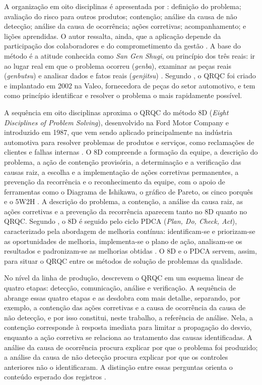 A organização em oito disciplinas é apresentada por : definição do problema; avaliação do risco para outros produtos; contenção; análise da causa de não detecção; análise da causa de ocorrência; ações corretivas; acompanhamento; e lições aprendidas. O autor ressalta, ainda, que a aplicação depende da participação dos colaboradores e do comprometimento da gestão \cite[p.~221]{moreira2023}. A base do método é a atitude conhecida como \textit{San Gen Shugi}, ou princípio dos três reais: ir ao lugar real em que o problema ocorreu (\textit{genba}), examinar as peças reais (\textit{genbutsu}) e analisar dados e fatos reais (\textit{genjitsu}) \cite[p.~224]{moreira2023}. Segundo , o QRQC foi criado e implantado em 2002 na Valeo, fornecedora de peças do setor automotivo, e tem como princípio identificar e resolver o problema o mais rapidamente possível.

A sequência em oito disciplinas aproxima o QRQC do método 8D (\textit{Eight Disciplines of Problem Solving}), desenvolvido na Ford Motor Company e introduzido em 1987, que vem sendo aplicado principalmente na indústria automotiva para resolver problemas de produtos e serviços, como reclamações de clientes e falhas internas \cite[seç.~2]{realyvasquez2020}. O 8D compreende a formação da equipe, a descrição do problema, a ação de contenção provisória, a determinação e a verificação das causas raiz, a escolha e a implementação de ações corretivas permanentes, a prevenção da recorrência e o reconhecimento da equipe, com o apoio de ferramentas como o Diagrama de Ishikawa, o gráfico de Pareto, os cinco porquês e o 5W2H \cite[seç.~1 e 3]{realyvasquez2020}. A descrição do problema, a contenção, a análise da causa raiz, as ações corretivas e a prevenção da recorrência aparecem tanto no 8D quanto no QRQC. Segundo , o 8D é seguido pelo ciclo PDCA (\textit{Plan, Do, Check, Act}), caracterizado pela abordagem de melhoria contínua: identificam-se e priorizam-se as oportunidades de melhoria, implementa-se o plano de ação, analisam-se os resultados e padronizam-se as melhorias obtidas \cite[seç.~3.2]{realyvasquez2018}. O 8D e o PDCA servem, assim, para situar o QRQC entre os métodos de solução de problemas da qualidade.

No nível da linha de produção,  descrevem o QRQC em um esquema linear de quatro etapas: detecção, comunicação, análise e verificação. A sequência de  abrange essas quatro etapas e as desdobra com mais detalhe, separando, por exemplo, a contenção das ações corretivas e a causa de ocorrência da causa de não detecção, e por isso constitui, neste trabalho, a referência de análise. Nela, a contenção corresponde à resposta imediata para limitar a propagação do desvio, enquanto a ação corretiva se relaciona ao tratamento das causas identificadas. A análise da causa de ocorrência procura explicar por que o problema foi produzido; a análise da causa de não detecção procura explicar por que os controles anteriores não o identificaram. A distinção entre essas perguntas orienta o conteúdo esperado dos registros \cite[p.~221--222]{moreira2023}.

